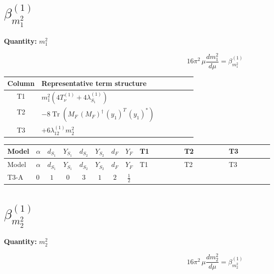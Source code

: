 \documentclass[8pt]{article}
\begin{document}
\begin{landscape}
\section*{$\beta_{m_1^2}^{(1)}$}
\noindent\textbf{Quantity: }$m_1^2$\par\smallskip
\[16\pi^2\,\mu\frac{d m_1^2}{d\mu}=\beta_{m_1^2}^{(1)}\]
\begin{center}
\begin{tabular}{@{}c >{\raggedright\arraybackslash}p{0.82\linewidth}@{}}
\toprule
Column & Representative term structure \\
\midrule
T1 & \(\displaystyle {m_1^2} (4 T_{\nu}^{(1)}+4 {\lambda_{S_1}^{(1)}})\) \\
\midrule
T2 & \(\displaystyle -8 \operatorname{Tr}\!\left({M_F}\,\left({M_F}\right)^{\dagger}\,\left({y_1}\right)^{T}\,\left({y_1}\right)^{*}\right)\) \\
\midrule
T3 & \(\displaystyle +6 {\lambda_{12}^{(1)}} {m_2^2}\) \\
\midrule
\bottomrule
\end{tabular}
\end{center}
\smallskip
\tiny
\begin{longtable}{@{}llcccccc >{\raggedright\arraybackslash}p{0.21\linewidth} >{\raggedright\arraybackslash}p{0.21\linewidth} >{\raggedright\arraybackslash}p{0.21\linewidth}@{}}
\toprule
Model & $\alpha$ & $d_{S_1}$ & $Y_{S_1}$ & $d_{S_2}$ & $Y_{S_2}$ & $d_F$ & $Y_F$ & T1 & T2 & T3 \\
\midrule
\endfirsthead
\toprule
Model & $\alpha$ & $d_{S_1}$ & $Y_{S_1}$ & $d_{S_2}$ & $Y_{S_2}$ & $d_F$ & $Y_F$ & T1 & T2 & T3 \\
\midrule
\endhead
T3-A & $0$ & $1$ & $0$ & $3$ & $1$ & $2$ & $\frac{1}{2}$ & \scriptsize\adjustbox{max width=\linewidth}{$\begin{gathered} {m_1^2} (4 T_{\nu}^{(1)}+4 {\lambda_{S_1}^{(1)}})\end{gathered}$} & \scriptsize\adjustbox{max width=\linewidth}{$\begin{gathered} -8 \operatorname{Tr}\!\left({M_F}\,\left({M_F}\right)^{\dagger}\,\left({y_1}\right)^{T}\,\left({y_1}\right)^{*}\right)\end{gathered}$} & \scriptsize\adjustbox{max width=\linewidth}{$\begin{gathered} +6 {\lambda_{12}^{(1)}} {m_2^2}\end{gathered}$} \\
\midrule
\bottomrule
\end{longtable}
\clearpage
\section*{$\beta_{m_2^2}^{(1)}$}
\noindent\textbf{Quantity: }$m_2^2$\par\smallskip
\[16\pi^2\,\mu\frac{d m_2^2}{d\mu}=\beta_{m_2^2}^{(1)}\]

\end{landscape}
\end{document}
